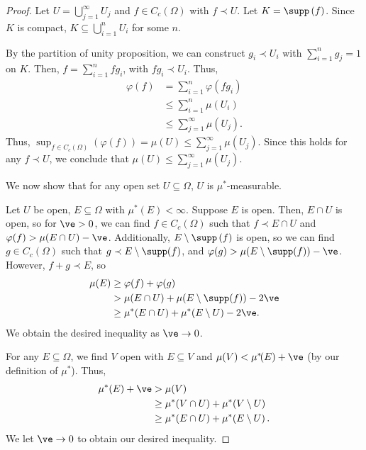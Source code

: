 \documentclass[10pt]{mypackage}
\begin{document}
\begin{proof}
  Let $U = \bigcup_{j=1}^{\infty}U_j$ and $f\in C_c\left(\Omega\right)$ with $f\prec U$. Let $K = \supp\left(f\right)$. Since $K$ is compact, $K\subseteq \bigcup_{i=1}^{n}U_i$ for some $n$.\newline

  By the partition of unity proposition, we can construct $g_i \prec U_i$ with $\sum_{i=1}^{n}g_j = 1$ on $K$. Then, $f = \sum_{i=1}^{n}fg_i$, with $fg_i\prec U_i$. Thus,
  \begin{align*}
    \varphi(f) &= \sum_{i=1}^{n}\varphi\left(fg_i\right)\\
               &\leq \sum_{i=1}^{n}\mu\!\left(U_i\right)\\
               &\leq \sum_{j=1}^{\infty}\mu\!\left(U_j\right).
  \end{align*}
  Thus, $\sup_{f\in C_c\left(\Omega\right)}\left(\varphi(f)\right) = \mu\!\left(U\right) \leq \sum_{j=1}^{\infty}\mu\!\left(U_j\right)$. Since this holds for any $f\prec U$, we conclude that $\mu\!\left(U\right) \leq \sum_{j=1}^{\infty}\mu\!\left(U_j\right)$.\newline

  We now show that for any open set $U\subseteq \Omega$, $U$ is $\mu^{\ast}$-measurable.\newline

  Let $U$ be open, $E\subseteq \Omega$ with $\mu^{\ast}\!\left(E\right) < \infty$. Suppose $E$ is open. Then, $E\cap U$ is open, so for $\ve > 0$, we can find $f\in C_c\left(\Omega\right)$ such that $f\prec E\cap U$ and $\varphi(f) > \mu\!\left(E\cap U\right) - \ve$. Additionally, $E\setminus \supp\left(f\right)$ is open, so we can find $g\in C_c\left(\Omega\right)$ such that $g\prec E\setminus \supp(f)$, and $\varphi(g) > \mu\!\left(E\setminus \supp(f)\right) - \ve$. However, $f + g\prec E$, so
  \begin{align*}
    \mu(E) &\geq \varphi(f) + \varphi(g)\\
           &> \mu\!\left(E\cap U\right) + \mu\!\left(E\setminus \supp(f)\right) - 2\ve\\
           &\geq \mu^{\ast}\!\left(E\cap U\right) + \mu^{\ast}\!\left(E\setminus U\right) - 2\ve.
  \end{align*}
  We obtain the desired inequality as $\ve\rightarrow 0$.\newline

  For any $E\subseteq \Omega$, we find $V$ open with $E\subseteq V$ and $\mu(V) < \mu^{\ast}\!(E) + \ve$ (by our definition of $\mu^{\ast}$). Thus,
  \begin{align*}
    \mu^{\ast}\!\left(E\right) + \ve &> \mu\!\left(V\right)\\
                                     &\geq \mu^{\ast}\!\left(V\cap U\right) + \mu^{\ast}\!\left(V\setminus U\right)\\
                                     &\geq \mu^{\ast}\!\left(E\cap U\right) + \mu^{\ast}\!\left(E\setminus U\right).
  \end{align*}
  We let $\ve \rightarrow 0$ to obtain our desired inequality.\newline


\end{proof}
\end{document}
